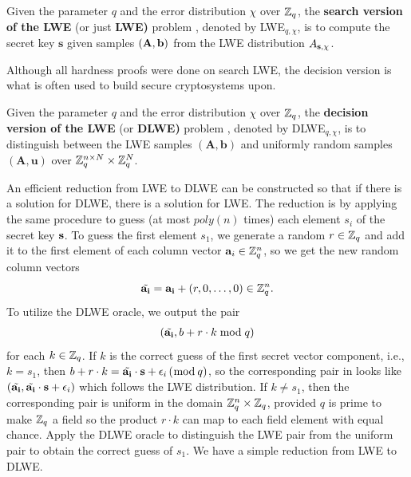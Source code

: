 \documentclass[../main.tex]{subfiles}
\begin{document}
\begin{definition}
Given the parameter $q$ and the error distribution $\chi$ over $\mathbb{Z}_q$, the \textbf{search version of the LWE} (or just \textbf{LWE)} problem , denoted by LWE$_{q,\chi}$, is to compute the secret key $\mathbf{s}$ given samples  $(\mathbf{A},\mathbf{b})$ from the LWE distribution $A_{\mathbf{s},\chi}$. 
\end{definition}

Although all hardness proofs were done on search LWE, the decision version is what is often used to build secure cryptosystems upon. 

\begin{definition}
Given the parameter $q$ and the error distribution $\chi$ over $\mathbb{Z}_q$, the \textbf{decision version of the LWE} (or \textbf{DLWE)} problem , denoted by DLWE$_{q,\chi}$, is to distinguish between the LWE samples $(\mathbf{A}, \mathbf{b})$ and uniformly random samples $(\mathbf{A}, \mathbf{u})$ over $\mathbb{Z}_q^{n \times N} \times \mathbb{Z}_q^N$. 
\end{definition}

An efficient reduction 
\reversemarginpar
{}
from LWE to DLWE can be constructed so that if there is a solution for DLWE, there is a solution for LWE. The reduction is by applying the same procedure to guess (at most $poly(n)$ times) each element $s_i$ of the secret key $\mathbf{s}$. To guess the first element $s_1$, we generate a random $r \in \mathbb{Z}_q$ and add it to the first element of each column vector $\mathbf{a}_i \in \mathbb{Z}_q^n$, so we get the new random column vectors
\begin{equation*}
    \Tilde{\mathbf{a_i}} = \mathbf{a_i}+ (r, 0, \dots, 0) \in \mathbb{Z}_q^n.
\end{equation*}
To utilize the DLWE oracle, we output the pair
\begin{align}
\label{equ:dlweToSlwe}
    (\Tilde{\mathbf{a_i}}, b+r \cdot k \bmod q)
\end{align}
for each $k \in \mathbb{Z}_q$. If $k$ is the correct guess of the first secret vector component, i.e., $k=s_1$, then $b+r\cdot k = \Tilde{\mathbf{a_i}} \cdot \mathbf{s} + \epsilon_i \,(\bmod \,q)$, so the corresponding pair in  looks like $(\Tilde{\mathbf{a_i}}, \Tilde{\mathbf{a_i}} \cdot \mathbf{s} + \epsilon_i)$ which follows the LWE distribution. If $k \neq s_1$, then the corresponding pair is uniform in the domain $\mathbb{Z}_q^n \times \mathbb{Z}_q$, provided $q$ is prime to make $\mathbb{Z}_q$ a field so the product $r\cdot k$ can map to each field element with equal chance. Apply the DLWE oracle to distinguish the LWE pair from the uniform pair to obtain the correct guess of $s_1$. We have a simple reduction from LWE to DLWE. 
\end{document}
